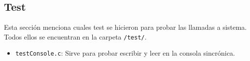 \subsection*{Test}
Esta sección menciona cuales test se hicieron para probar las llamadas a sistema. Todos ellos se encuentran en la carpeta \texttt{/test/}.
\begin{itemize}
    \item \texttt{testConsole.c}: Sirve para probar escribir y leer en la consola sincrónica.
\end{itemize}
\section{}
\section{}
\section{}